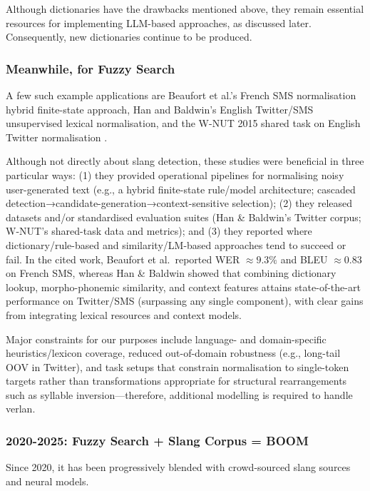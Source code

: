 \documentclass[12pt]{article}
\begin{document}
Although dictionaries have the drawbacks mentioned above, they remain essential resources for implementing LLM-based approaches, as discussed later. Consequently, new dictionaries continue to be produced.


\subsubsection{Meanwhile, for Fuzzy Search}

A few such example applications are Beaufort et al.'s French SMS normalisation hybrid finite-state approach, Han and Baldwin's English Twitter/SMS unsupervised lexical normalisation, and the W-NUT 2015 shared task on English Twitter normalisation \cite{beaufort2010hybrid,han2011lexical,baldwin2015shared}.

Although not directly about slang detection, these studies were beneficial in three particular ways: (1) they provided operational pipelines for normalising noisy user-generated text (e.g., a hybrid finite-state rule/model architecture; cascaded detection→candidate-generation→context-sensitive selection); (2) they released datasets and/or standardised evaluation suites (Han \& Baldwin's Twitter corpus; W-NUT's shared-task data and metrics); and (3) they reported where dictionary/rule-based and similarity/LM-based approaches tend to succeed or fail. In the cited work, Beaufort et al.\ reported WER $\approx 9.3\%$ and BLEU $\approx 0.83$ on French SMS, whereas Han \& Baldwin showed that combining dictionary lookup, morpho-phonemic similarity, and context features attains state-of-the-art performance on Twitter/SMS (surpassing any single component), with clear gains from integrating lexical resources and context models.

Major constraints for our purposes include language- and domain-specific heuristics/lexicon coverage, reduced out-of-domain robustness (e.g., long-tail OOV in Twitter), and task setups that constrain normalisation to single-token targets rather than transformations appropriate for structural rearrangements such as syllable inversion---therefore, additional modelling is required to handle verlan.


\subsubsection{2020-2025: Fuzzy Search + Slang Corpus = BOOM}

Since 2020, it has been progressively blended with crowd-sourced slang sources and neural models.
\end{document}
